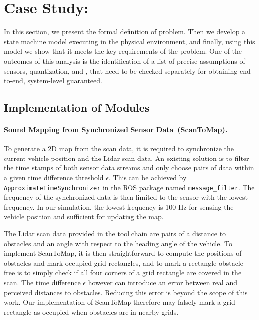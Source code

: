 \section{Case Study: \appname}
\label{sec:formal}


In this section, we present the formal definition of \appname problem.
Then we develop a state machine model executing in the physical environment,
and finally, using this model we show that it meets the key requirements of the problem.
One of the outcomes of this analysis is the identification of a list of precise assumptions of sensors,
quantization, and , that need to be checked separately for obtaining end-to-end, system-level guaranteed.

%




\subsection{Implementation of Modules}

\paragraph{Sound Mapping from Synchronized Sensor Data~(ScanToMap).}
To generate a 2D map from the scan data,
it is required to synchronize the current vehicle position and the Lidar scan data.
An existing solution is to filter the time stamps of both sensor data streams
and only choose pairs of data within a given time difference threshold $\epsilon$.
This can be achieved by \texttt{ApproximateTimeSynchronizer} in the ROS package named \texttt{message\_filter}.
The frequency of the synchronized data is then limited to the sensor with the lowest frequency.
In our simulation, the lowest frequency is 100 Hz for sensing the vehicle position and sufficient for updating the map.

The Lidar scan data provided in the tool chain are pairs of a distance to obstacles and an angle with respect to the heading angle of the vehicle.
To implement ScanToMap, it is then straightforward to compute the positions of obstacles and mark occupied grid rectangles,
and to mark a rectangle obstacle free is to simply check if all four corners of a grid rectangle are covered in the scan.
The time difference $\epsilon$ however can introduce an error between real and perceived distances to obstacles.
Reducing this error is beyond the scope of this work.
Our implementation of ScanToMap therefore may falsely mark a grid rectangle as occupied when obstacles are in nearby grids.

